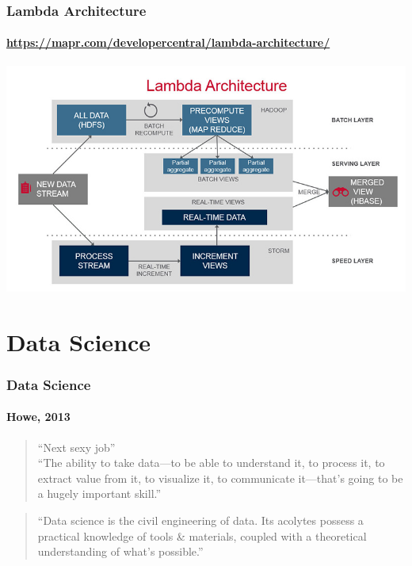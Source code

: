 \documentclass[14pt]{beamer}
\begin{document}
\begin{frame}
  \frametitle{Lambda Architecture}
  \framesubtitle{\url{https://mapr.com/developercentral/lambda-architecture/}}
  \centering\includegraphics[width=\textwidth]{img/lambda-architecture}
\end{frame}

\section{Data Science}

\begin{frame}
  \frametitle{Data Science}
  \framesubtitle{Howe, 2013}
\vspace*{-.5em}
  \begin{quote}
    ``Next sexy job'' \\
    ``The ability to take data—to be able to understand it, to
process it, to extract value from it, to visualize it, to
communicate it—that’s going to be a hugely important skill.'' \\
  \hspace*{}
  \end{quote}
    \begin{quote}
``Data science is the civil engineering of data. Its acolytes
possess a practical knowledge of tools \& materials, coupled
with a theoretical understanding of what's possible.''\\
  \hspace*{}
  \end{quote}

\end{frame}
\end{document}

